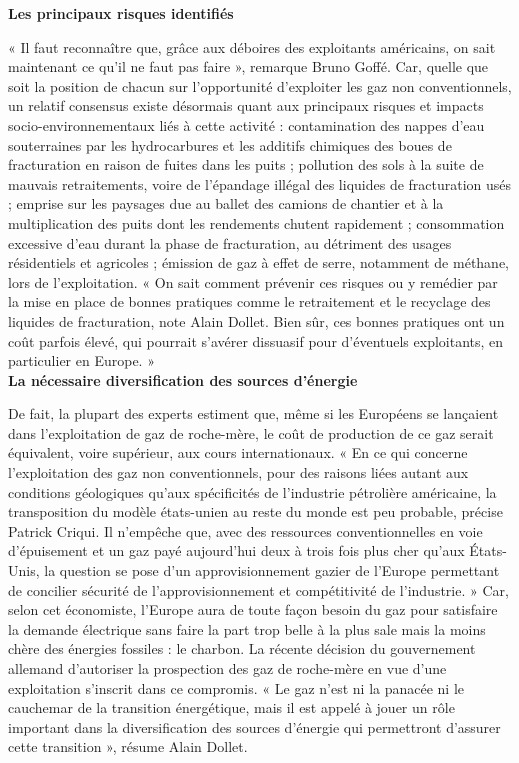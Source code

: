 \documentclass[8pt]{article}
\begin{document}
\textbf{Les principaux risques identifiés}

« Il faut reconnaître que, grâce aux déboires des exploitants américains, on sait maintenant ce qu’il ne faut pas faire », remarque Bruno Goffé. Car, quelle que soit la position de chacun sur l’opportunité d’exploiter les gaz non conventionnels, un relatif consensus existe désormais quant aux principaux risques et impacts socio-environnementaux liés à cette activité : contamination des nappes d’eau souterraines par les hydrocarbures et les additifs chimiques des boues de fracturation en raison de fuites dans les puits ; pollution des sols à la suite de mauvais retraitements, voire de l’épandage illégal des liquides de fracturation usés ; emprise sur les paysages due au ballet des camions de chantier et à la multiplication des puits dont les rendements chutent rapidement ; consommation excessive d’eau durant la phase de fracturation, au détriment des usages résidentiels et agricoles ; émission de gaz à effet de serre, notamment de ­méthane, lors de l’exploitation. « On sait comment prévenir ces risques ou y remédier par la mise en place de bonnes pratiques comme le retraitement et le recyclage des liquides de fracturation, note Alain Dollet. Bien sûr, ces bonnes pratiques ont un coût parfois élevé, qui pourrait s’avérer dissuasif pour d’éventuels exploitants, en particulier en Europe. » \\


\textbf{La nécessaire diversification des sources d’énergie}

De fait, la plupart des experts estiment que, même si les Européens se lançaient dans l’exploitation de gaz de roche-mère, le coût de production de ce gaz serait équivalent, voire supérieur, aux cours internationaux. « En ce qui concerne l’exploitation des gaz non conventionnels, pour des raisons liées autant aux conditions géologiques qu’aux spécificités de l’industrie pétrolière américaine, la transposition du modèle états-unien au reste du monde est peu probable, précise Patrick Criqui. Il n’empêche que, avec des ressources conventionnelles en voie d’épuisement et un gaz payé ­aujourd’hui deux à trois fois plus cher qu’aux États-Unis, la question se pose d’un approvisionnement gazier de l’Europe permettant de concilier sécurité de l’approvisionnement et compétitivité de l’industrie. » Car, selon cet économiste, l’Europe aura de toute façon besoin du gaz pour satisfaire la demande électrique sans faire la part trop belle à la plus sale mais la moins chère des énergies fossiles : le charbon. La récente décision du gouvernement allemand d’autoriser la prospection des gaz de roche-mère en vue d’une exploitation s’inscrit dans ce compromis. « Le gaz n’est ni la panacée ni le cauchemar de la transition énergétique, mais il est appelé à jouer un rôle important dans la diversification des sources d’énergie qui permettront d’assurer cette transition », résume Alain Dollet. \\
\end{document}

